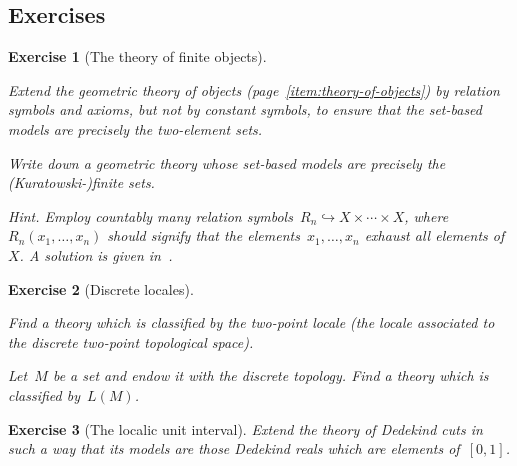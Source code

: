 \documentclass{ws-rv9x6}
\newtheorem{ex}{Exercise}
\newenvironment{exercise}[1]{
  \begin{ex}[#1]
}{\end{ex}}
\renewcommand{\_}{\mathpunct{.}}
\newcommand{\?}{\,{:}\,}
\begin{document}
\subsection*{Exercises}

\begin{exercise}{The theory of finite objects}%
\begin{alphlist}[(c)]
\item Extend the geometric theory of objects
(page~\ref{item:theory-of-objects}) by relation symbols and axioms, but not by
constant symbols, to ensure that the set-based models are precisely the
two-element sets.
\item Write down a geometric theory whose set-based models are precisely the
(Kuratowski-)finite sets.\smallskip

{\scriptsize\emph{Hint.} Employ countably many relation symbols~$R_n
\hookrightarrow X \times \cdots \times X$, where~$R_n(x_1,\ldots,x_n)$ should
signify that the elements~$x_1,\ldots,x_n$ exhaust all elements of~$X$. A
solution is given in~\cite[Example~D1.1.7(k)]{johnstone:elephant}.\par}
\end{alphlist}
\end{exercise}

\begin{exercise}{Discrete locales}%
\begin{alphlist}[(b)]
\item Find a theory which is classified by the two-point locale (the locale
associated to the discrete two-point topological space).
\item Let~$M$ be a set and endow it with the discrete topology. Find a theory
which is classified by~$L(M)$.
\end{alphlist}
\end{exercise}

\begin{exercise}{The localic unit interval}%
Extend the theory of Dede\-kind cuts in such a way that its models are those
Dedekind reals which are elements of~$[0,1]$.
\end{exercise}
\end{document}
